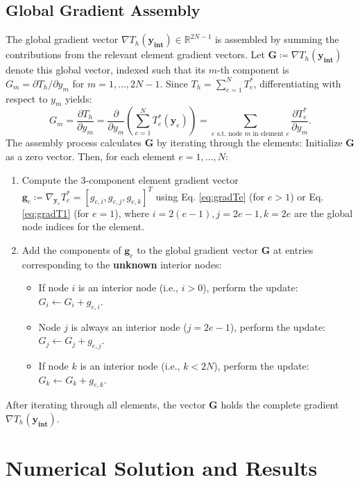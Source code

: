 \documentclass[11pt]{article}
\begin{document}
\subsection{Global Gradient Assembly}

The global gradient vector \( \nabla T_h(\mathbf{y_\text{int}}) \in \mathbb{R}^{2N-1} \) is assembled by summing the contributions from the relevant element gradient vectors. Let \( \mathbf{G} \coloneqq \nabla T_h(\mathbf{y_\text{int}}) \) denote this global vector, indexed such that its $m$-th component is \( G_m = \partial T_h / \partial y_m \) for \( m=1, \dots, 2N-1 \). Since \( T_h = \sum_{e=1}^{N} T_e^* \), differentiating with respect to \( y_m \) yields:
\[
    G_m = \frac{\partial T_h}{\partial y_{m}} = \frac{\partial}{\partial y_{m}} \left( \sum_{e=1}^{N} T_e^*(\mathbf{y}_e) \right) = \sum_{e \text{ s.t. node } m \text{ in element } e} \frac{\partial T_e^*}{\partial y_{m}}.
\]
The assembly process calculates \( \mathbf{G} \) by iterating through the elements: Initialize \( \mathbf{G} \) as a zero vector. Then, for each element \( e = 1, \dots, N \):
\begin{enumerate}
    \item Compute the 3-component element gradient vector \( \mathbf{g}_e \coloneqq \nabla_{\mathbf{y}_e} T_e^* = [g_{e,i}, g_{e,j}, g_{e,k}]^T \) using Eq. \eqref{eq:gradTe} (for \(e > 1\)) or Eq. \eqref{eq:gradT1} (for \(e=1\)), where \(i=2(e-1), j=2e-1, k=2e\) are the global node indices for the element.
    \item Add the components of \( \mathbf{g}_e \) to the global gradient vector \( \mathbf{G} \) at entries corresponding to the \textbf{unknown} interior nodes:
    \begin{itemize}
        \item If node \( i \) is an interior node (i.e., \( i > 0 \)), perform the update: \( G_i \leftarrow G_i + g_{e,i} \).
        \item Node \( j \) is always an interior node (\( j = 2e-1 \)), perform the update: \( G_j \leftarrow G_j + g_{e,j} \).
        \item If node \( k \) is an interior node (i.e., \( k < 2N \)), perform the update: \( G_k \leftarrow G_k + g_{e,k} \).
    \end{itemize}
\end{enumerate}
After iterating through all elements, the vector \( \mathbf{G} \) holds the complete gradient \( \nabla T_h(\mathbf{y_\text{int}}) \).
\section{Numerical Solution and Results}
\end{document}
